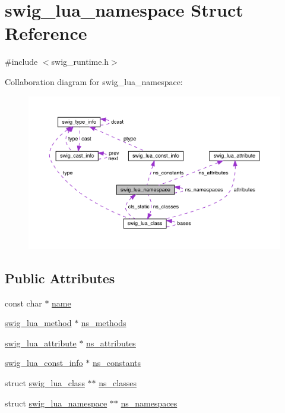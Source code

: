 \hypertarget{structswig__lua__namespace}{}\section{swig\+\_\+lua\+\_\+namespace Struct Reference}
\label{structswig__lua__namespace}


{\ttfamily \#include $<$swig\+\_\+runtime.\+h$>$}



Collaboration diagram for swig\+\_\+lua\+\_\+namespace\+:\nopagebreak
\begin{figure}[H]
\begin{center}
\leavevmode
\includegraphics[width=350pt]{structswig__lua__namespace__coll__graph}
\end{center}
\end{figure}
\subsection*{Public Attributes}
\begin{DoxyCompactItemize}
\item 
const char $\ast$ \mbox{\hyperlink{structswig__lua__namespace_a5ac77da56177f2221e7b4383d08289ae}{name}}
\item 
\mbox{\hyperlink{swig__runtime_8h_a89958881f4c9d723a197b20ac42f6946}{swig\+\_\+lua\+\_\+method}} $\ast$ \mbox{\hyperlink{structswig__lua__namespace_a37c8e142ef569ca010f1a5ced9d32446}{ns\+\_\+methods}}
\item 
\mbox{\hyperlink{structswig__lua__attribute}{swig\+\_\+lua\+\_\+attribute}} $\ast$ \mbox{\hyperlink{structswig__lua__namespace_a3f3aabc0b901e923d739c5b5bce0770d}{ns\+\_\+attributes}}
\item 
\mbox{\hyperlink{structswig__lua__const__info}{swig\+\_\+lua\+\_\+const\+\_\+info}} $\ast$ \mbox{\hyperlink{structswig__lua__namespace_aa6dee03944121832fcbd7a939d096d08}{ns\+\_\+constants}}
\item 
struct \mbox{\hyperlink{structswig__lua__class}{swig\+\_\+lua\+\_\+class}} $\ast$$\ast$ \mbox{\hyperlink{structswig__lua__namespace_a6497c3aceb8de15113fb214a74a3e019}{ns\+\_\+classes}}
\item 
struct \mbox{\hyperlink{structswig__lua__namespace}{swig\+\_\+lua\+\_\+namespace}} $\ast$$\ast$ \mbox{\hyperlink{structswig__lua__namespace_ae8c454726d38da0b31becead391fef5b}{ns\+\_\+namespaces}}
\end{DoxyCompactItemize}


